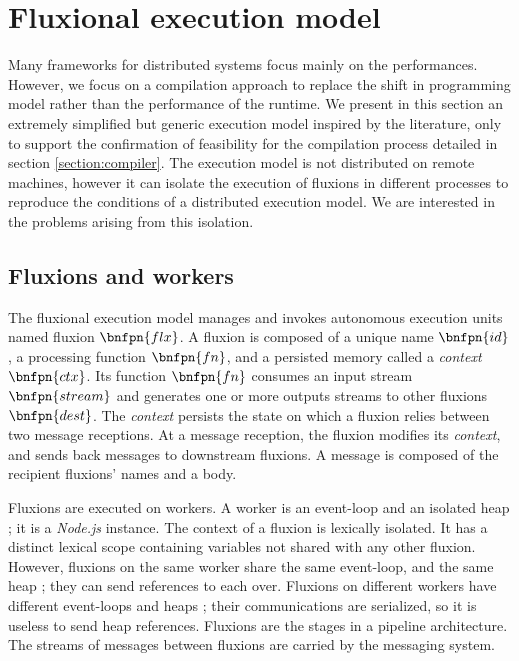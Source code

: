 \section{Fluxional execution model} \label{section:model}

Many frameworks for distributed systems focus mainly on the performances\cite{Akidau2013, Jain2006, Marz2011, Welsh2000, Wu2007, Zaharia2010}.
However, we focus on a compilation approach to replace the shift in programming model rather than the performance of the runtime.
We present in this section an extremely simplified but generic execution model inspired by the literature, only to support the confirmation of feasibility for the compilation process detailed in section \ref{section:compiler}.
The execution model is not distributed on remote machines, however it can isolate the execution of fluxions in different processes to reproduce the conditions of a distributed execution model.
We are interested in the problems arising from this isolation.

\subsection{Fluxions and workers}

The fluxional execution model manages and invokes autonomous execution units named fluxion $\bnfpn{flx}$.
A fluxion is composed of a unique name $\bnfpn{id}$, a processing function $\bnfpn{fn}$, and a persisted memory called a \textit{context} $\bnfpn{ctx}$.
Its function $\bnfpn{fn}$ consumes an input stream $\bnfpn{stream}$ and generates one or more outputs streams to other fluxions $\bnfpn{dest}$.
The \textit{context} persists the state on which a fluxion relies between two message receptions.
At a message reception, the fluxion modifies its \textit{context}, and sends back messages to downstream fluxions.
A message is composed of the recipient fluxions' names and a body.

Fluxions are executed on workers.
A worker is an event-loop and an isolated heap ; it is a \textit{Node.js} instance.
The context of a fluxion is lexically isolated.
It has a distinct lexical scope containing variables not shared with any other fluxion.
However, fluxions on the same worker share the same event-loop, and the same heap ; they can send references to each over.
Fluxions on different workers have different event-loops and heaps ; their communications are serialized, so it is useless to send heap references.
Fluxions are the stages in a pipeline architecture.
The streams of messages between fluxions are carried by the messaging system.

